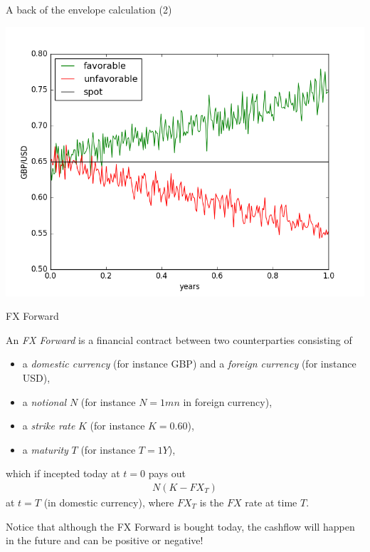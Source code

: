 \documentclass[t]{beamer}
\begin{document}
\begin{frame}{A back of the envelope calculation (2)}
	\begin{center}
		\includegraphics[scale=0.4]{pics/fx_scenarios.png}
	\end{center}
\end{frame}


\begin{frame}{FX Forward}
	\begin{definition}[FX Forward]
		An \emph{FX Forward} is a financial contract between two counterparties consisting of
		\begin{itemize}
			\item
				a \emph{domestic currency} (for instance GBP) and a \emph{foreign currency} (for instance USD),
			\item
				a \emph{notional} $N$ (for instance $N=1mn$ in foreign currency),
			\item
				a \emph{strike rate} $K$ (for instance $K=0.60$),
			\item
				a \emph{maturity} $T$ (for instance $T=1Y$),
		\end{itemize}
		which if incepted today at $t=0$ pays out 
			\begin{align*}
				N(K-FX_{T})
			\end{align*}
		at $t=T$ (in domestic currency), where $FX_T$ is the $FX$ rate at time $T$.
	\end{definition}
	Notice that although the FX Forward is bought today, the cashflow will happen in the future and can be positive or negative!	
\end{frame}
\end{document}
